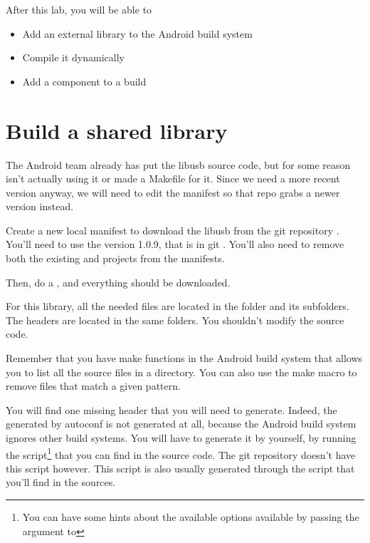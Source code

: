 
After this lab, you will be able to
\begin{itemize}
  \item Add an external library to the Android build system
  \item Compile it dynamically
  \item Add a component to a build
\end{itemize}

\section{Build a shared library}

The Android team already has put the libusb source code, but for some
reason isn't actually using it or made a Makefile for it. Since we
need a more recent version anyway, we will need to edit the manifest
so that repo grabs a newer version instead.

Create a new local manifest to download the libusb from the git
repository . You'll need to use the
version 1.0.9, that is in git . You'll also need
to remove both the existing  and 
projects from the manifests.

Then, do a , and everything should be downloaded.

For this library, all the needed  files are located in the
 folder and its subfolders. The headers are located in
the same folders. You shouldn't modify the  source code.

Remember that you have make functions in the Android build system that
allows you to list all the source files in a directory. You can also
use the  make macro to remove files that match a
given pattern.

You will find one missing header that you will need to
generate. Indeed, the  generated by autoconf is not
generated at all, because the Android build system ignores other build
systems. You will have to generate it by yourself, by running the
 script\footnote{You can have some hints about the
  available options available by passing the  argument to
  } that you can find in the  source
code. The git repository doesn't have this  script
however. This script is also usually generated through the
 script that you'll find in the sources.

